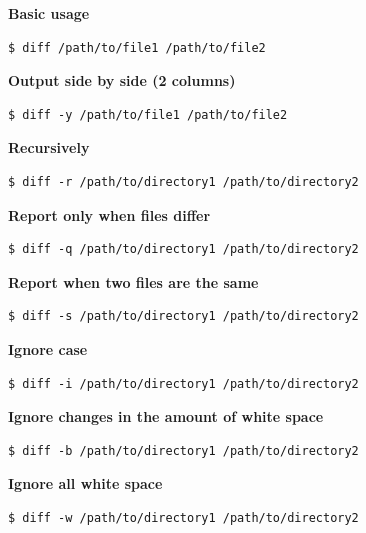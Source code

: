 \documentclass{article}
\newenvironment{codetemplate}[1][]{%
  \mybasecolorbox[#1]
  \itshape
}{%
  \endmybasecolorbox
}
\begin{document}
\textbf{Basic usage}
\begin{codetemplate}{}
\begin{verbatim}
$ diff /path/to/file1 /path/to/file2
\end{verbatim}
\end{codetemplate}

\textbf{Output side by side (2 columns)}
\begin{codetemplate}{}
\begin{verbatim}
$ diff -y /path/to/file1 /path/to/file2
\end{verbatim}
\end{codetemplate}

\textbf{Recursively}
\begin{codetemplate}{}
\begin{verbatim}
$ diff -r /path/to/directory1 /path/to/directory2
\end{verbatim}
\end{codetemplate}

\textbf{Report only when files differ}
\begin{codetemplate}{}
\begin{verbatim}
$ diff -q /path/to/directory1 /path/to/directory2
\end{verbatim}
\end{codetemplate}

\textbf{Report when two files are the same}
\begin{codetemplate}{}
\begin{verbatim}
$ diff -s /path/to/directory1 /path/to/directory2
\end{verbatim}
\end{codetemplate}

\textbf{Ignore case}
\begin{codetemplate}{}
\begin{verbatim}
$ diff -i /path/to/directory1 /path/to/directory2
\end{verbatim}
\end{codetemplate}

\textbf{Ignore changes in the amount of white space}
\begin{codetemplate}{}
\begin{verbatim}
$ diff -b /path/to/directory1 /path/to/directory2
\end{verbatim}
\end{codetemplate}

\textbf{Ignore all white space}
\begin{codetemplate}{}
\begin{verbatim}
$ diff -w /path/to/directory1 /path/to/directory2
\end{verbatim}
\end{codetemplate}
\end{document}
